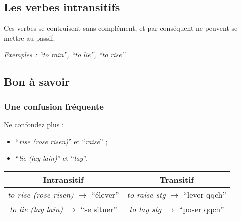 \documentclass[
  10pt,
]{article}
\providecommand{\tightlist}{%
  \setlength{\itemsep}{0pt}\setlength{\parskip}{0pt}}
\begin{document}
\hypertarget{les-verbes-intransitifs}{%
\subsection{Les verbes intransitifs}\label{les-verbes-intransitifs}}

Ces verbes se contruisent sans complément, et par conséquent ne peuvent se mettre au passif.

\emph{Exemples : ``to rain'', ``to lie'', ``to rise''}.

\hypertarget{bon-uxe0-savoir-1}{%
\subsection{Bon à savoir}\label{bon-uxe0-savoir-1}}

\hypertarget{une-confusion-fruxe9quente}{%
\subsubsection{Une confusion fréquente}\label{une-confusion-fruxe9quente}}

Ne confondez plus :

\begin{itemize}
\tightlist
\item
  ``\emph{rise (rose risen)}'' et ``\emph{raise}'' ;
\item
  ``\emph{lie (lay lain)}'' et ``\emph{lay}''.
\end{itemize}

\begin{longtable}[]{@{}cc@{}}
\toprule
\begin{minipage}[b]{0.48\columnwidth}\centering
\textbf{Intransitif}\strut
\end{minipage} & \begin{minipage}[b]{0.46\columnwidth}\centering
\textbf{Transitif}\strut
\end{minipage}\tabularnewline
\midrule
\endhead
\begin{minipage}[t]{0.48\columnwidth}\centering
\emph{to rise (rose risen)} \(\rightarrow\) ``élever''\strut
\end{minipage} & \begin{minipage}[t]{0.46\columnwidth}\centering
\emph{to raise stg} \(\rightarrow\) ``lever qqch''\strut
\end{minipage}\tabularnewline
\begin{minipage}[t]{0.48\columnwidth}\centering
\emph{to lie (lay lain)} \(\rightarrow\) ``se situer''\strut
\end{minipage} & \begin{minipage}[t]{0.46\columnwidth}\centering
\emph{to lay stg} \(\rightarrow\) ``poser qqch''\strut
\end{minipage}\tabularnewline
\bottomrule
\end{longtable}
\end{document}
